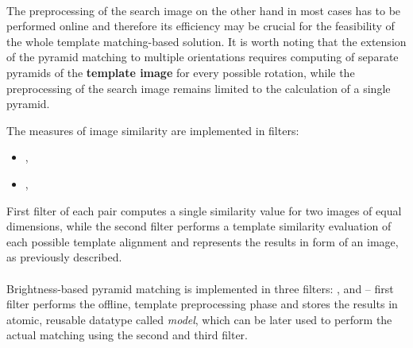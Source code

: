 \paragraph*{}
The preprocessing of the search image on the other hand in most cases has to be performed online and therefore its efficiency may be crucial for the feasibility of the whole template matching-based solution. It is worth noting that the extension of the pyramid matching to multiple orientations requires computing of separate pyramids of the \textbf{template image} for every possible rotation, while the preprocessing of the search image remains limited to the calculation of a single pyramid.  

\begin{refImpl}
The measures of image similarity are implemented in \studio filters:
\begin{itemize}
	\item {}, 
	\item {}, 
\end{itemize}
First filter of each pair computes a single similarity value for two images of equal dimensions, while the second filter performs a template similarity evaluation of each possible template alignment and represents the results in form of an image, as previously described.

\paragraph*{}
Brightness-based pyramid matching is implemented in three \studio filters: ,  and  -- first filter performs the offline, template preprocessing phase and stores the results in atomic, reusable datatype called \textit{model}, which can be later used to perform the actual matching using the second and third filter.
\end{refImpl}